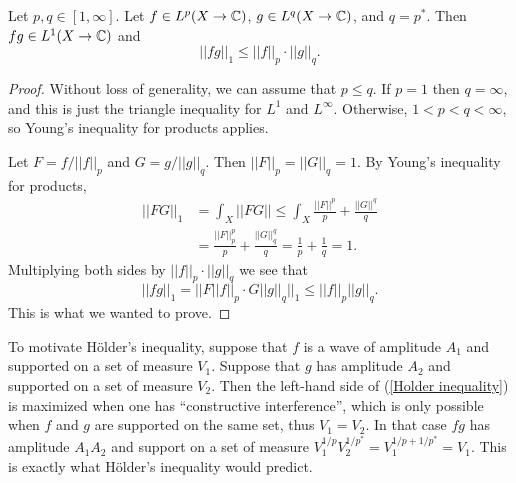 \begin{theorem}
Let $p, q \in [1, \infty]$.
Let $f \in L^{p}(X \to \mathbb{C})$, $g \in L^{q}(X \to \mathbb{C})$, and $q = p^{*}$.
Then $fg \in L^{1}(X \to \mathbb{C})$ and
\begin{equation}\label{Holder inequality}
||fg||_{1} \leq ||f||_{p}  \cdot ||g||_{q}.
\end{equation}
\end{theorem}
\begin{proof}
Without loss of generality, we can assume that $p \leq q$.
If $p = 1$ then $q = \infty$, and this is just the triangle inequality for $L^{1}$ and $L^{\infty}$.
Otherwise, $1 < p < q < \infty$, so Young's inequality for products applies.

Let $F = f/||f||_{p} $ and $G = g/||g||_{q}$. Then $||F||_{p}  = ||G||_{q} = 1$.
By Young's inequality for products,
\begin{align*}||FG||_{1} &= \int_{X} ||FG|| \leq \int_{X} \frac{||F||^{p}}{p} + \frac{||G||^{q}}{q}\\
&= \frac{||F||_{p} ^{p}}{p} + \frac{||G||_{q}^{q}}{q} = \frac{1}{p} + \frac{1}{q}  = 1.
\end{align*}
Multiplying both sides by $||f||_{p}  \cdot ||g||_{q}$ we see that
\[||fg||_{1} = ||F||f||_{p}  \cdot G||g||_{q}||_{1} \leq ||f||_{p}  ||g||_{q}.\]
This is what we wanted to prove.
\end{proof}

To motivate H\"older's inequality, suppose that $f$ is a wave of amplitude $A_{1}$ and supported on a set of measure $V_{1}$.
Suppose that $g$ has amplitude $A_{2}$ and supported on a set of measure $V_{2}$.
Then the left-hand side of (\ref{Holder inequality}) is maximized when one has ``constructive interference'', which is only possible when $f$ and $g$ are supported on the same set, thus $V_{1} = V_{2}$.
In that case $fg$ has amplitude $A_{1}A_{2}$ and support on a set of measure $V_{1}^{1/p}V_{2}^{1/p^{*}} = V_{1}^{1/p+1/p^{*}} = V_{1}$.
This is exactly what H\"older's inequality would predict.

